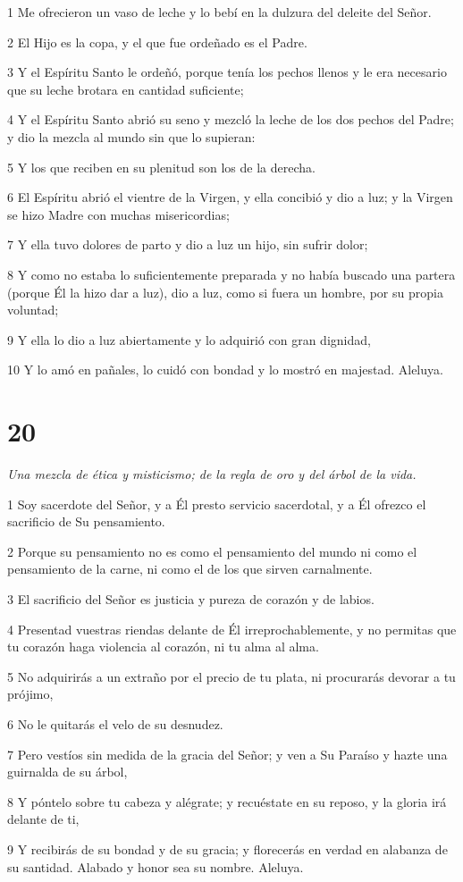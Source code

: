 \par 1 Me ofrecieron un vaso de leche y lo bebí en la dulzura del deleite del Señor.
\par 2 El Hijo es la copa, y el que fue ordeñado es el Padre.
\par 3 Y el Espíritu Santo le ordeñó, porque tenía los pechos llenos y le era necesario que su leche brotara en cantidad suficiente;
\par 4 Y el Espíritu Santo abrió su seno y mezcló la leche de los dos pechos del Padre; y dio la mezcla al mundo sin que lo supieran:
\par 5 Y los que reciben en su plenitud son los de la derecha.
\par 6 El Espíritu abrió el vientre de la Virgen, y ella concibió y dio a luz; y la Virgen se hizo Madre con muchas misericordias;
\par 7 Y ella tuvo dolores de parto y dio a luz un hijo, sin sufrir dolor;
\par 8 Y como no estaba lo suficientemente preparada y no había buscado una partera (porque Él la hizo dar a luz), dio a luz, como si fuera un hombre, por su propia voluntad;
\par 9 Y ella lo dio a luz abiertamente y lo adquirió con gran dignidad,
\par 10 Y lo amó en pañales, lo cuidó con bondad y lo mostró en majestad. Aleluya.

\chapter{20}

\par \textit{Una mezcla de ética y misticismo; de la regla de oro y del árbol de la vida.}

\par 1 Soy sacerdote del Señor, y a Él presto servicio sacerdotal, y a Él ofrezco el sacrificio de Su pensamiento.
\par 2 Porque su pensamiento no es como el pensamiento del mundo ni como el pensamiento de la carne, ni como el de los que sirven carnalmente.
\par 3 El sacrificio del Señor es justicia y pureza de corazón y de labios.
\par 4 Presentad vuestras riendas delante de Él irreprochablemente, y no permitas que tu corazón haga violencia al corazón, ni tu alma al alma.
\par 5 No adquirirás a un extraño por el precio de tu plata, ni procurarás devorar a tu prójimo,
\par 6 No le quitarás el velo de su desnudez.
\par 7 Pero vestíos sin medida de la gracia del Señor; y ven a Su Paraíso y hazte una guirnalda de su árbol,
\par 8 Y póntelo sobre tu cabeza y alégrate; y recuéstate en su reposo, y la gloria irá delante de ti,
\par 9 Y recibirás de su bondad y de su gracia; y florecerás en verdad en alabanza de su santidad. Alabado y honor sea su nombre. Aleluya.

